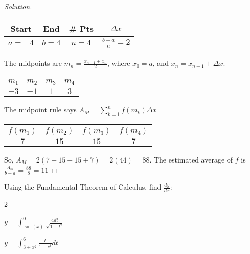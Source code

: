 \documentclass[crop=false,class=article,oneside]{standalone}
\begin{document}
        \begin{proof}[Solution]
            \
            \begin{table}[H]
                \centering
                \begin{tabular}{|c|c|c|c|}
                    \hline
                    Start&End&\# Pts&$\Delta x$\\
                    \hline
                    $a=-4$&$b=4$&$n=4$&$\frac{b-a}{n}=2$\\
                    \hline
                \end{tabular}
            \end{table}
            The midpoints are $m_{n}=\frac{x_{n-1}+x_{n}}{2}$,
            where $x_{0}=a$, and $x_{n}=x_{n-1}+\Delta x$.
            \begin{table}[H]
                \centering
                \begin{tabular}{|c|c|c|c|}
                    \hline
                    $m_{1}$&$m_{2}$&$m_{3}$&$m_{4}$\\
                    \hline
                    $-3$&$-1$&$1$&$3$\\
                    \hline
                \end{tabular}
            \end{table}
            The midpoint rule says $A_{M}=\sum_{k=1}^{n}f(m_{k})\Delta x$
            \begin{table}[H]
                \centering
                \begin{tabular}{|c|c|c|c|}
                    \hline
                    $f(m_{1})$&$f(m_{2})$&$f(m_{3})$&$f(m_{4})$\\
                    \hline
                    $7$&$15$&$15$&$7$\\
                    \hline
                \end{tabular}
            \end{table}
            So, $A_{M}=2(7+15+15+7)=2(44)=88$.
            The estimated average of $f$ is
            $\frac{A_{m}}{b-a}=\frac{88}{8}=11$
        \end{proof}
        \begin{problem}
        Using the Fundamental Theorem of Calculus, find $\frac{dy}{dx}$:
        \begin{enumerate}
        \end{enumerate}
        \end{problem}
\end{document}
